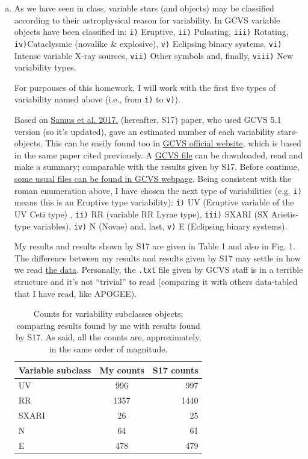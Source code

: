\begin{enumerate} [a)]
\item As we have seen in class, variable stars (and objects) may be classified according to their astrophysical reason for variability. In GCVS variable objects have been classified in: \texttt{i)} Eruptive, \texttt{ii)} Pulsating, \texttt{iii)} Rotating, \texttt{iv)}Cataclysmic (novalike \& explosive), \texttt{v)} Eclipsing binary systems, \texttt{vi)} Intense variable X-ray sources, \texttt{vii)} Other symbols and, finally, \texttt{viii)} New variability types.

For purpouses of this homework, I will work with the first five types of variability named above (i.e., from \texttt{i)} to \texttt{v)}).

Based on \href{http://adsabs.harvard.edu/abs/2017ARep...61...80S}
  {Samus et al. 2017.} (hereafter, S17) paper, who used GCVS 5.1 version (so it's updated), gave an estimated number of each variability stars-objects. This can be easily found too in \href{http://www.sai.msu.su/gcvs/gcvs/gcvs5/vartype.htm}{GCVS official website}, which is based in the same paper cited previously. A \href{http://www.sai.msu.su/gcvs/gcvs/gcvs5/gcvs5.txt}{GCVS file} can be downloaded, read and make a summary; comparable with the results given by S17. Before continue, \href{http://www.sai.msu.su/gcvs/gcvs/gcvs5/}{some usual files can be found in GCVS webpage}. Being consistent with the roman enumeration above, I have chosen the next type of variabilities (e.g. \texttt{i)} means this is an Eruptive type variability): \texttt{i)} UV (Eruptive variable of the UV Ceti type) , \texttt{ii)} RR (variable RR Lyrae type), \texttt{iii)} SXARI (SX Arietis-type variables), \texttt{iv)} N (Novae) and, last, \texttt{v)} E (Eclipsing binary systems).
  
My results and results shown by S17 are given in Table 1 and also in Fig. 1. The difference between my results and results given by S17 may settle in how we read \href{http://www.sai.msu.su/gcvs/gcvs/gcvs5/gcvs5.txt}{the data}. Personally, the \texttt{.txt} file given by GCVS staff is in a terrible structure and it's not ``trivial'' to read (comparing it with others data-tabled that I have read, like APOGEE).

\begin{table}[ht]
\centering
\caption{\label{table:parameters} Counts for variability subclasses objects; comparing results found by me with results found by S17. As said, all the counts are, approximately, in the same order of magnitude.}
\begin{tabular}{lcr}
\hline
\hline
Variable subclass                          & My counts & S17 counts     \\
\hline
 UV        &       996 & 997\\
 RR & 1357 & 1440 \\
 SXARI & 26 & 25 \\
 N & 64 & 61 \\
 E & 478 & 479 \\
\hline
\end{tabular}
\end{table}


\end{enumerate}
